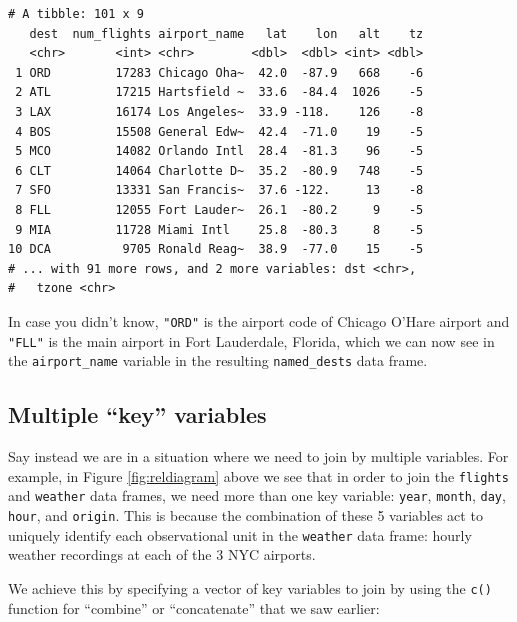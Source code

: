\documentclass[12pt, krantz2,]{krantz}
\makeatletter
\newenvironment{Shaded}{\begin{snugshade}}{\end{snugshade}}
\newcommand{\DataTypeTok}[1]{\textcolor[rgb]{0.27,0.27,0.27}{#1}}
\newcommand{\KeywordTok}[1]{\textcolor[rgb]{0.27,0.27,0.27}{\textbf{#1}}}
\newcommand{\NormalTok}[1]{#1}
\newcommand{\OperatorTok}[1]{\textcolor[rgb]{0.43,0.43,0.43}{\textbf{#1}}}
\newcommand{\StringTok}[1]{\textcolor[rgb]{0.5,0.5,0.5}{#1}}
\newenvironment{kframe}{%
\medskip{}
\setlength{\fboxsep}{.8em}
 \def\at@end@of@kframe{}%
 \ifinner\ifhmode%
  \def\at@end@of@kframe{\end{minipage}}%
  \begin{minipage}{\columnwidth}%
 \fi\fi%
 \def\FrameCommand##1{\hskip\@totalleftmargin \hskip-\fboxsep
 \colorbox{shadecolor}{##1}\hskip-\fboxsep
     \hskip-\linewidth \hskip-\@totalleftmargin \hskip\columnwidth}%
 \MakeFramed {\advance\hsize-\width
   \@totalleftmargin\z@ \linewidth\hsize
   \@setminipage}}%
 {\par\unskip\endMakeFramed%
 \at@end@of@kframe}
\renewenvironment{Shaded}{\begin{kframe}}{\end{kframe}}
\makeatother
\begin{document}
\begin{verbatim}
# A tibble: 101 x 9
   dest  num_flights airport_name   lat    lon   alt    tz
   <chr>       <int> <chr>        <dbl>  <dbl> <int> <dbl>
 1 ORD         17283 Chicago Oha~  42.0  -87.9   668    -6
 2 ATL         17215 Hartsfield ~  33.6  -84.4  1026    -5
 3 LAX         16174 Los Angeles~  33.9 -118.    126    -8
 4 BOS         15508 General Edw~  42.4  -71.0    19    -5
 5 MCO         14082 Orlando Intl  28.4  -81.3    96    -5
 6 CLT         14064 Charlotte D~  35.2  -80.9   748    -5
 7 SFO         13331 San Francis~  37.6 -122.     13    -8
 8 FLL         12055 Fort Lauder~  26.1  -80.2     9    -5
 9 MIA         11728 Miami Intl    25.8  -80.3     8    -5
10 DCA          9705 Ronald Reag~  38.9  -77.0    15    -5
# ... with 91 more rows, and 2 more variables: dst <chr>,
#   tzone <chr>
\end{verbatim}

In case you didn't know, \texttt{"ORD"} is the airport code of Chicago O'Hare airport and \texttt{"FLL"} is the main airport in Fort Lauderdale, Florida, which we can now see in the \texttt{airport\_name} variable in the resulting \texttt{named\_dests} data frame.

\hypertarget{multiple-key-variables}{%
\subsection{Multiple ``key'' variables}\label{multiple-key-variables}}

Say instead we are in a situation where we need to join by multiple variables. For example, in Figure \ref{fig:reldiagram} above we see that in order to join the \texttt{flights} and \texttt{weather} data frames, we need more than one key variable: \texttt{year}, \texttt{month}, \texttt{day}, \texttt{hour}, and \texttt{origin}. This is because the combination of these 5 variables act to uniquely identify each observational unit in the \texttt{weather} data frame: hourly weather recordings at each of the 3 NYC airports.

We achieve this by specifying a vector of key variables to join by using the \texttt{c()} function for ``combine'' or ``concatenate'' that we saw earlier:

\begin{Shaded}
\end{Shaded}
\end{document}
